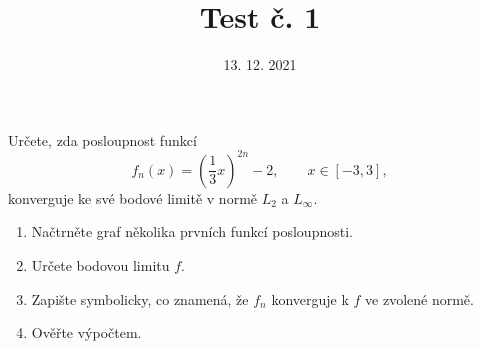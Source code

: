 \documentclass{article}
\begin{document}
\title{Test č. 1}
\date{13. 12. 2021}
\author{}
\maketitle


\noindent
Určete, zda posloupnost funkcí
\[
f_n(x) = \left( \frac{1}{3}x \right)^{2n}-2, \qquad x\in[-3,3],
\]
konverguje ke své bodové limitě v normě $L_2$ a $L_\infty$.

\vspace{2cm}

\begin{enumerate}
\item Načtrněte graf několika prvních funkcí posloupnosti.
\item Určete bodovou limitu $f$.
\item Zapište symbolicky, co znamená, že $f_n$ konverguje k $f$ ve zvolené normě.
\item Ověřte výpočtem.
\end{enumerate}
\end{document}
